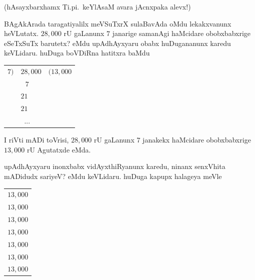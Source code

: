 (hAsayxbarxhamx Ti.pi.\ keYlAsaM avara jAcnxpaka alevx!)

\bigskip

\noindent
\begin{minipage}[c]{6cm}
\qquad BAgAkArada taragatiyalilx meVSuTxrX sulaBavAda oMdu lekakxvanunx heVLutatx. $28,000$ rU gaLanunx $7$ janarige samanAgi haMcidare obobxbabxrige eSeTxSuTx barutetx? eMdu upAdhAyxyaru obabx huDugananunx karedu keVLidaru. huDuga boVDiRna hatitxra baMdu
\end{minipage}
\quad
\begin{minipage}[c]{4cm}
\begin{center}
\begin{tabular}{r@{\,}l@{\,}l}
$7\Big)$ & $28,000$ & $\Big(13,000$\\
     & ~\,$7$ & \\
\cline{2-2}
     & $21$ &\\
     & $21$ &\\
\cline{2-2}
     & ~... &  
\end{tabular}
\end{center}
\end{minipage}

\medskip

I riVti mADi toVrisi, $28,000$ rU gaLanunx $7$ janakekx haMcidare obobxbabxrige $13,000$ rU Agutatxde eMda.

\bigskip

\noindent
\begin{minipage}[c]{5.5cm}
\qquad upAdhAyxyaru inonxbabx vidAyxthiRyanunx karedu, ninanx senxVhita mADidudx sariyeV? eMdu keVLidaru. huDuga kapupx halageya meVle
\end{minipage}
\quad
\begin{minipage}[c]{4cm}
\begin{center}
\begin{tabular}{l}
$13,000$\\
$13,000$\\
$13,000$\\
$13,000$\\
$13,000$\\
$13,000$\\
$13,000$\\
\hline
\end{tabular}
\end{center}
\end{minipage}

